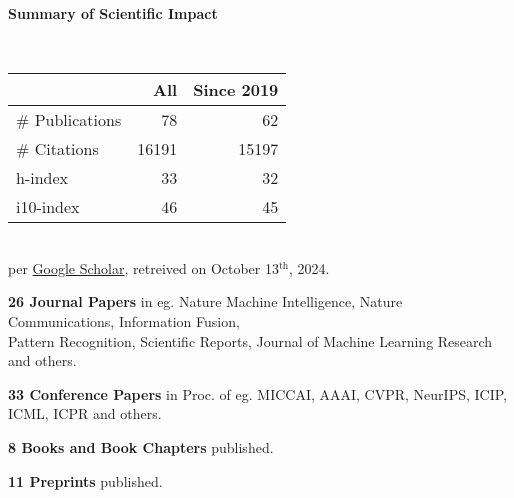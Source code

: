 \headedsection %
{\bf Summary of Scientific Impact}{}{}
{
    \qquad~~~~
    \begin{minipage}[t]{0.6\textwidth}
        \begin{tabular}{lrr}
        \hline
         & All & Since 2019\\
        \hline
        \# Publications & 78     & 62    \\
        \# Citations    & 16191  & 15197 \\
        h-index         & 33     & 32    \\
        i10-index       & 46     & 45    \\
        \hline
    \end{tabular}
    \\
    {\footnotesize{
        per \href{https://scholar.google.com/citations?user=wpLQuroAAAAJ}{Google Scholar},
        retreived on October 13$^\text{th}$, 2024.
        }
    }
    \end{minipage}

    \ifdefined\shortcv
        \vstep
        {\bf 26 Journal Papers} in eg. Nature Machine Intelligence, Nature Communications, Information Fusion,\\
        \hspace*{\fill} Pattern Recognition, Scientific Reports, Journal of Machine Learning Research and others.

        {\bf 33 Conference Papers} in Proc. of eg. MICCAI, AAAI, CVPR, NeurIPS, ICIP, ICML, ICPR and others.

        {\bf 8 Books and Book Chapters} published.

        {\bf 11 Preprints} published.
        
    \else
        {}
    \fi

}
